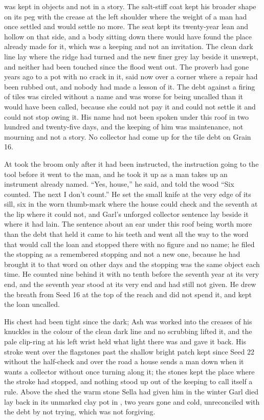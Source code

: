 \scenebreak

 was kept in objects and not in a story. The salt-stiff coat kept his broader shape on its peg with the crease at the left shoulder where the weight of a man had once settled and would settle no more. The seat kept its twenty-year lean and hollow on that side, and a body sitting down there would have found the place already made for it, which was a keeping and not an invitation. The clean dark line lay where the ridge had turned and the new finer grey lay beside it unswept, and neither had been touched since the flood went out. The proverb had gone years ago to a pot with no crack in it, said now over a corner where a repair had been rubbed out, and nobody had made a lesson of it. The debt against a firing of tiles was circled without a name and was worse for being uncalled than it would have been called, because she could not pay it and could not settle it and could not stop owing it. His name had not been spoken under this roof in two hundred and twenty-five days, and the keeping of him was maintenance, not mourning and not a story. No collector had come up  for the tile debt on Grain 16.

\scenebreak

At   took the broom only after it had been instructed, the instruction going to the tool before it went to the man, and he took it up as a man takes up an instrument already named. “Yes, house,” he said, and told the wood “Six counted. The next I don't count.” He set the small knife at the very edge of its sill, six in the worn thumb-mark where the house could check and the seventh at the lip where it could not, and Garl's unforged collector sentence lay beside it where it had lain. The sentence about an ear under this roof being worth more than the debt that held it came to his teeth and went all the way to the word that would call the loan and stopped there with no figure and no name; he filed the stopping as a remembered stopping and not a new one, because he had brought it to that word on other days and the stopping was the same object each time. He counted nine behind it with no tenth before the seventh year at its very end, and the seventh year stood at its very end and had still not given. He drew the breath from Seed 16 at the top of the reach and did not spend it, and kept the loan uncalled.

His chest had been tight since the dark; Ash was worked into the creases of his knuckles in the colour of the clean dark line and no scrubbing lifted it, and the pale clip-ring at his left wrist held what light there was and gave it back. His stroke went over the flagstones past the shallow bright patch kept since Seed 22 without the half-check and over the road a house sends a man down when it wants a collector without once turning along it; the stones kept the place where the stroke had stopped, and nothing stood up out of the keeping to call itself a rule. Above the shed the warm stone Sella had given him in the winter Garl died lay back in its unmarked clay pot in , two years gone and cold, unreconciled with the debt by not trying, which was not forgiving.

